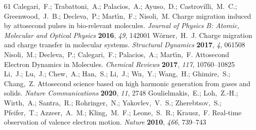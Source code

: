 \documentclass[journal=jacsat,manuscript=article]{achemso}
\begin{document}
\begin{mcitethebibliography}{61}
Calegari,~F.; Trabattoni,~A.; Palacios,~A.; Ayuso,~D.; Castrovilli,~M.~C.;
  Greenwood,~J.~B.; Decleva,~P.; Mart{\'{\i}}n,~F.; Nisoli,~M. Charge migration
  induced by attosecond pulses in bio-relevant molecules. \emph{Journal of
  Physics B: Atomic, Molecular and Optical Physics} \textbf{2016}, \emph{49},
  142001\relax
\mciteBstWouldAddEndPuncttrue
\mciteSetBstMidEndSepPunct{\mcitedefaultmidpunct}
{\mcitedefaultendpunct}{\mcitedefaultseppunct}\relax
\EndOfBibitem
{}
Wörner,~H.~J.   Charge migration and charge transfer in
  molecular systems. \emph{Structural Dynamics} \textbf{2017}, \emph{4},
  061508\relax
\mciteBstWouldAddEndPuncttrue
\mciteSetBstMidEndSepPunct{\mcitedefaultmidpunct}
{\mcitedefaultendpunct}{\mcitedefaultseppunct}\relax
\EndOfBibitem
{}
Nisoli,~M.; Decleva,~P.; Calegari,~F.; Palacios,~A.; Mart\'{\i}n,~F. Attosecond
  Electron Dynamics in Molecules. \emph{Chemical Reviews} \textbf{2017},
  \emph{117}, 10760--10825\relax
\mciteBstWouldAddEndPuncttrue
\mciteSetBstMidEndSepPunct{\mcitedefaultmidpunct}
{\mcitedefaultendpunct}{\mcitedefaultseppunct}\relax
\EndOfBibitem
{}
Li,~J.; Lu,~J.; Chew,~A.; Han,~S.; Li,~J.; Wu,~Y.; Wang,~H.; Ghimire,~S.;
  Chang,~Z. Attosecond science based on high harmonic generation from gases and
  solids. \emph{Nature Communications} \textbf{2020}, \emph{11}, 2748\relax
\mciteBstWouldAddEndPuncttrue
\mciteSetBstMidEndSepPunct{\mcitedefaultmidpunct}
{\mcitedefaultendpunct}{\mcitedefaultseppunct}\relax
\EndOfBibitem
{}
Goulielmakis,~E.; Loh,~Z.-H.; Wirth,~A.; Santra,~R.; Rohringer,~N.;
  Yakovlev,~V.~S.; Zherebtsov,~S.; Pfeifer,~T.; Azzeer,~A.~M.; Kling,~M.~F.;
  Leone,~S.~R.; Krausz,~F. Real-time observation of valence electron motion.
  \emph{Nature} \textbf{2010}, \emph{466}, 739--743\relax
\mciteBstWouldAddEndPuncttrue
\mciteSetBstMidEndSepPunct{\mcitedefaultmidpunct}

\end{mcitethebibliography}
\end{document}
